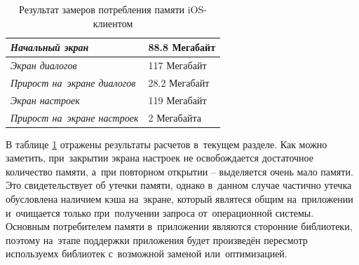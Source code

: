 \begin{table}[h!]
\caption{Результат замеров потребления памяти iOS-клиентом}
\label{sec:eng:memory:result}
\centering
\begin{tabularx}{\textwidth}{ |X|X| } 
 \hline
 \emph{Начальный экран} & \num{88.8} Мегабайт \\ 
 \hline
 \emph{Экран диалогов} & \num{117} Мегабайт \\ 
 \hline
 \emph{Прирост на~экране диалогов} & \num{28.2} Мегабайт \\ 
 \hline
 \emph{Экран настроек} & \num{119} Мегабайт \\ 
 \hline
 \emph{Прирост на~экране настроек} & \num{2} Мегабайта \\ 
 \hline
\end{tabularx}
\end{table}

В таблице \ref{sec:eng:memory:result} отражены результаты расчетов в~текущем разделе. Как можно заметить, при~закрытии экрана настроек не освобождается достаточное количество памяти, а~при повторном открытии -- выделяется очень мало памяти. Это свидетельствует об утечки памяти, однако в~данном случае частично утечка обусловлена наличием кэша на~экране, который являтеся общим на~приложении и~очищается только при~получении запроса от~операционной системы. Основным потребителем памяти в~приложении являются сторонние библиотеки, поэтому на~этапе поддержки приложения будет произведён пересмотр используемх библиотек с~возможной заменой или~оптимизацией.